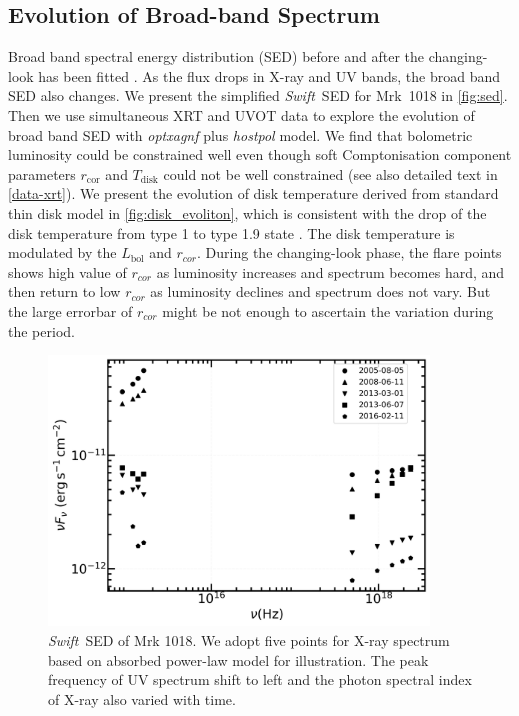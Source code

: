 \documentclass[twocolumn]{aastex63}
\newcommand{\swift}{{\small \it Swift}}
\begin{document}
\subsection{Evolution of Broad-band Spectrum}
\label{subsec:xray-uvot-sed}
Broad band spectral energy distribution (SED) before and after the changing-look has been fitted \citep{2016A&A...593L...9H}. As the flux drops in X-ray and UV bands, the broad band SED also changes. We present the simplified \swift \, SED for Mrk~1018 in \autoref{fig:sed}. Then we use simultaneous XRT and UVOT data to explore the evolution of broad band SED with {\it optxagnf} plus {\it hostpol} model. We find that bolometric luminosity could be constrained well even though soft Comptonisation component parameters $r_\mathrm{cor}$ and $T_\mathrm{disk}$ could not be well constrained (see also detailed text in \autoref{data-xrt}). We present the evolution of disk temperature derived from standard thin disk model in \autoref{fig:disk_evoliton}, which is consistent with the drop of the disk temperature from type 1 to type 1.9 state \citep[also described in][]{2016A&A...593L...9H}. The disk temperature is modulated by the $L_\mathrm{bol}$ and $r_{cor}$. During the changing-look phase, the flare points shows high value of $r_{cor}$ as luminosity increases and spectrum becomes hard, and then return to low $r_{cor}$ as luminosity declines and spectrum does not vary. But the large errorbar of $r_{cor}$ might be not enough to ascertain the variation during the period.

\begin{figure}
\centering
	\includegraphics[width=0.9\textwidth]{./pic/Mrk1018_sed_date.png}
    \caption{\swift \, SED of Mrk 1018. We adopt five points for X-ray spectrum based on absorbed power-law model for illustration. The peak frequency of UV spectrum shift to left and the photon spectral index of X-ray also varied with time.}
    \label{fig:sed}
\end{figure}
\end{document}
